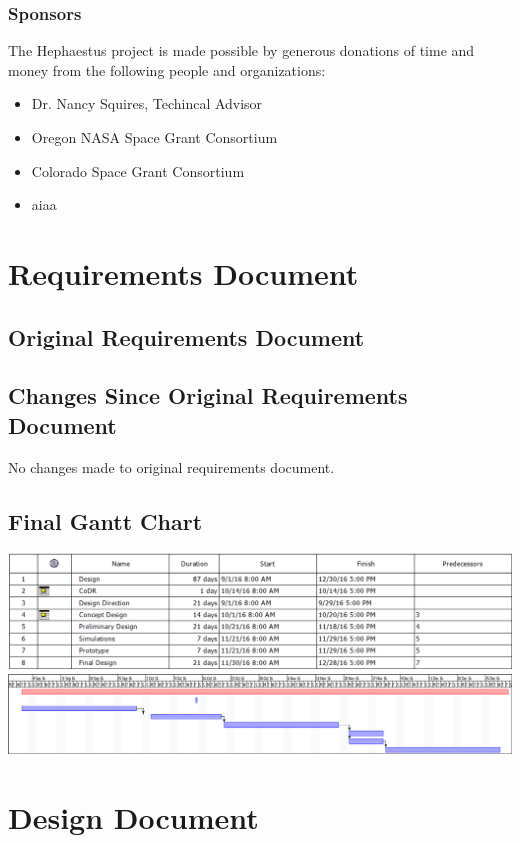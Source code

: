\documentclass[letterpaper,10pt]{article}
\begin{document}
\subsubsection{Sponsors}
The Hephaestus project is made possible by generous donations of time and money
from the following people and organizations:
\begin{itemize}
  \item{Dr. Nancy Squires, Techincal Advisor}
  \item{Oregon NASA Space Grant Consortium}
  \item{Colorado Space Grant Consortium}
  \item{\gls{aiaa}}
\end{itemize}

\section{Requirements Document}
\subsection{Original Requirements Document}


\subsection{Changes Since Original Requirements Document}
No changes made to original requirements document.

\subsection{Final Gantt Chart}
\includegraphics[width=\textwidth]{./images/gantttable}
\includegraphics[width=\textwidth]{./images/ganttchart}

\section{Design Document}
\end{document}
